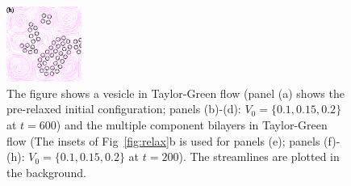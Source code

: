 \documentclass[aps,prl,preprint,groupedaddress]{revtex4-2}
\begin{document}
\begin{figure}
\begin{center}
    \includegraphics[width=0.22\textwidth]{BTG_3.pdf}
  \end{center}
  \vspace{-20pt}  
  \caption{\label{fig:BC1_TG_flow} The figure shows a vesicle in Taylor-Green flow (panel (a) shows the pre-relaxed initial configuration; panels (b)-(d): $V_0 = \{0.1, 0.15, 0.2\}$ at $t=600$) 
    and the multiple component bilayers in Taylor-Green flow (The insets of Fig~\ref{fig:relax}b is used for panels (e); panels (f)-(h): $V_0 = \{0.1, 0.15, 0.2\}$ at $t=200$). The streamlines are plotted in the background.
  }
\end{figure}
\end{document}
